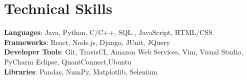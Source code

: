 \documentclass[letterpaper,11pt]{article}
\begin{document}
%
\section{Technical Skills}
 \begin{itemize}[leftmargin=0.15in, label={}]
    \small{\item{
     \textbf{Languages}{: Java, Python, C/C++, SQL , JavaScript, HTML/CSS} \\
     \textbf{Frameworks}{: React, Node.js, Django, JUnit, JQuery} \\
     \textbf{Developer Tools}{: Git, TravisCI, Amazon Web Services, Vim, Visual Studio, PyCharm Eclipse, QuantConnect,Ubuntu} \\
     \textbf{Libraries}{: Pandas, NumPy, Matplotlib, Selenium}
    }}
 \end{itemize}


\end{document}
